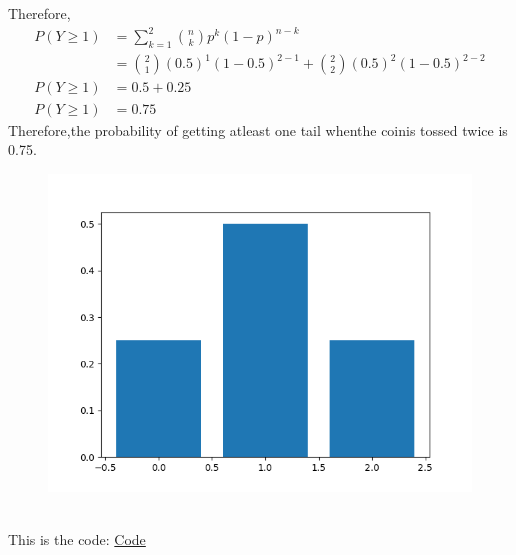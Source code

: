 \documentclass[10pt,twocolumn]{article}
\begin{document}
Therefore,
\begin{align}
	P(Y\geq 1)&=\sum_{k=1}^2 \binom nk p^k(1-p)^{n-k}\\
	&=\binom 21(0.5)^1(1-0.5)^{2-1}+\binom 22 (0.5)^2(1-0.5)^{2-2}\\
	P(Y\geq 1)&=0.5+0.25\\
	P(Y\geq 1)&= 0.75
\end{align}
Therefore,the probability of getting atleast one tail whenthe coinis tossed twice is 0.75.\\ 
\begin{figure}[h]
    \centering
\includegraphics[width=\columnwidth]{fig/11.16.3.2.png}
\end{figure}\\


This is the code: \href{https://github.com/ShreyaniReddy/IITH-FWC/blob/main/probability/11.16.3.2/codes/11.16.3.2.py}{Code}
\end{document}
